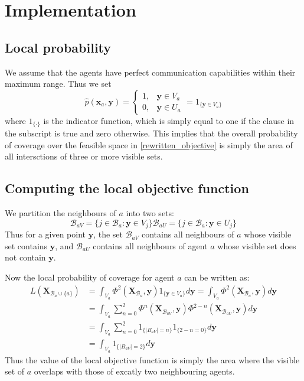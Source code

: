 \section{Implementation}
\subsection{Local probability}
We assume that the agents have perfect communication capabilities within their maximum range. Thus we set
\begin{equation}
  \hat{p}(\mathbf{x}_{a}, \mathbf{y}) = \begin{cases}
    1, &\mathbf{y}\in V_{a}\\
    0, &\mathbf{y}\in U_{a}
  \end{cases} = 1_{\big\{\mathbf{y}\in V_{a}\big\}}
\end{equation}
where $1_{\{\cdot\}}$ is the indicator function, which is simply equal to one if the clause in the subscript is true and zero otherwise.
This implies that the overall probability of coverage over the feasible space in \eqref{rewritten_objective} is simply the area of all intersctions of three or more visible sets.

\subsection{Computing the local objective function}
We partition the neighbours of $a$ into two sets:
\begin{subequations}
  \begin{equation}
    \mathcal{B}_{a V} = \{j\in\mathcal{B}_{a}: \mathbf{y}\in V_{j}\}
  \end{equation}
  \begin{equation}
    \mathcal{B}_{a U} = \{j\in\mathcal{B}_{a}: \mathbf{y}\in U_{j}\}
  \end{equation}
\end{subequations}
Thus for a given point $\mathbf{y}$, the set $\mathcal{B}_{a V}$ contains all neighbours of $a$ whose visible set contains $\mathbf{y}$,
and $\mathcal{B}_{a U}$ contains all neighbours of agent $a$ whose visible set does not contain $\mathbf{y}$.

Now the local probability of coverage for agent $a$ can be written as:
\begin{equation}
  \begin{split}
    L(\mathbf{X}_{\mathcal{B}_{a}\cup\{a\}}) &= \int_{V_{a}}\Phi^{2}(\mathbf{X}_{\mathcal{B}_{a}}, \mathbf{y})1_{\{\mathbf{y}\in V_{a}\}}d\mathbf{y} = \int_{V_{a}}\Phi^{2}(\mathbf{X}_{\mathcal{B}_{a}}, \mathbf{y})d\mathbf{y}\\
    &= \int_{V_{a}}\sum_{n = 0}^{2} \Phi^{n}(\mathbf{X}_{\mathcal{B}_{a V}}, \mathbf{y})\Phi^{2-n}(\mathbf{X}_{\mathcal{B}_{a U}},\mathbf{y})d\mathbf{y}\\
    &= \int_{V_{a}}\sum_{n = 0}^{2}1_{\{|B_{a V}| = n\}}1_{\{2-n = 0\}}d\mathbf{y}\\
    &= \int_{V_{a}}1_{\{|B_{a V}| = 2\}}d\mathbf{y}
  \end{split}
\end{equation}
Thus the value of the local objective function is simply the area where the visible set of $a$ overlaps with those of excatly two neighbouring agents.